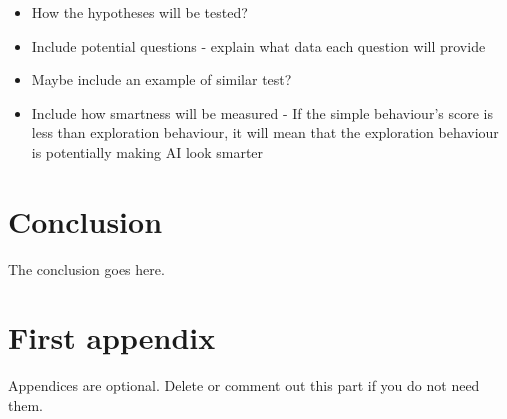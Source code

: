 \documentclass[journal]{IEEEtran}
\begin{document}
\begin{itemize}
	\item How the hypotheses will be tested?
	\item Include potential questions - explain what data each question will provide
	\item Maybe include an example of similar test?
	\item Include how smartness will be measured - If the simple behaviour's score is less than exploration behaviour, it will mean that the exploration behaviour is potentially making AI look smarter
\end{itemize}

\section{Conclusion}
The conclusion goes here.






\appendices
\section{First appendix}
Appendices are optional. Delete or comment out this part if you do not need them.


\end{document}
